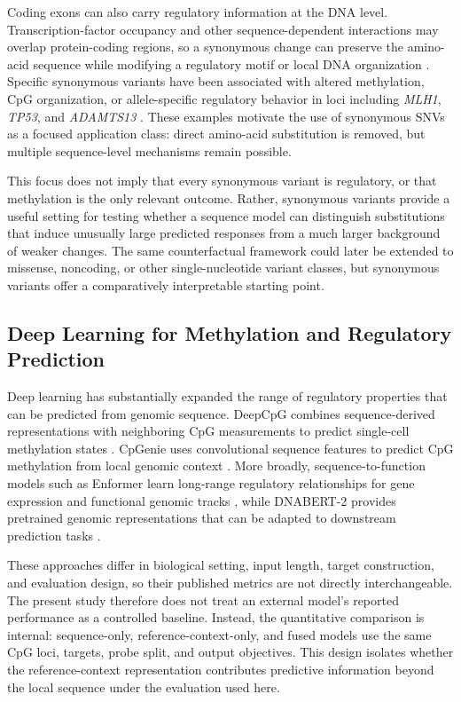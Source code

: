 \documentclass[10pt,letterpaper,twocolumn]{article}
\begin{document}
Coding exons can also carry regulatory information at the DNA level.
Transcription-factor occupancy and other sequence-dependent interactions
may overlap protein-coding regions, so a synonymous change can preserve
the amino-acid sequence while modifying a regulatory motif or local DNA
organization \cite{stergachis2013exonic}. Specific synonymous variants
have been associated with altered methylation, CpG organization, or
allele-specific regulatory behavior in loci including \textit{MLH1},
\textit{TP53}, and \textit{ADAMTS13}
\cite{alvarez2025,blackburn2016,hall2022}. These examples motivate the
use of synonymous SNVs as a focused application class: direct
amino-acid substitution is removed, but multiple sequence-level
mechanisms remain possible.

This focus does not imply that every synonymous variant is regulatory,
or that methylation is the only relevant outcome. Rather, synonymous
variants provide a useful setting for testing whether a sequence model
can distinguish substitutions that induce unusually large predicted
responses from a much larger background of weaker changes. The same
counterfactual framework could later be extended to missense,
noncoding, or other single-nucleotide variant classes, but synonymous
variants offer a comparatively interpretable starting point.

\subsection{Deep Learning for Methylation and Regulatory Prediction}

Deep learning has substantially expanded the range of regulatory
properties that can be predicted from genomic sequence. DeepCpG
combines sequence-derived representations with neighboring CpG
measurements to predict single-cell methylation states
\cite{angermueller2017deepcpg}. CpGenie uses convolutional sequence
features to predict CpG methylation from local genomic context
\cite{zeng2017predicting}. More broadly, sequence-to-function models
such as Enformer learn long-range regulatory relationships for gene
expression and functional genomic tracks
\cite{avsec2021effective}, while DNABERT-2 provides pretrained genomic
representations that can be adapted to downstream prediction tasks
\cite{zhou2023dnabert}.

These approaches differ in biological setting, input length, target
construction, and evaluation design, so their published metrics are not
directly interchangeable. The present study therefore does not treat an
external model's reported performance as a controlled baseline.
Instead, the quantitative comparison is internal: sequence-only,
reference-context-only, and fused models use the same CpG loci, targets,
probe split, and output objectives. This design isolates whether the
reference-context representation contributes predictive information
beyond the local sequence under the evaluation used here.
\end{document}
